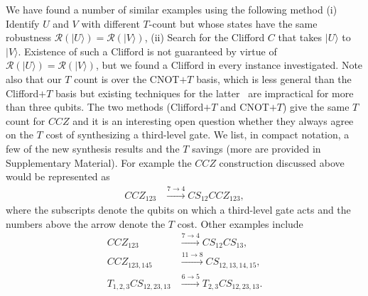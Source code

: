 \documentclass[aps,prl,twocolumn,showpacs,superscriptaddress,groupedaddress,amsmath,amssymb]{revtex4-1}  %
\def\ket #1{\vert #1\rangle}
\begin{document}
We have found a number of similar examples using the following method (i) Identify $U$ and $V$ with different $T$-count but whose states have the same robustness $\mathcal{R}(\ket{U})=\mathcal{R}(\ket{V})$, (ii) Search for the Clifford $C$ that takes $\ket{U}$ to $\ket{V}$.  Existence of such a Clifford is not guaranteed by virtue of $\mathcal{R}(\ket{U})=\mathcal{R}(\ket{V})$, but we found a Clifford in every instance investigated. Note also that our $T$ count is over the CNOT$+T$ basis, which is less general than the Clifford$+T$ basis but existing techniques for the latter~\cite{gosset_algorithm_2014} are impractical for more than three qubits. %
The two methods (Clifford$+T$ and CNOT$+T$) give the same $T$ count for $CCZ$ and it is an interesting open question whether they always agree on the $T$ cost of synthesizing a third-level gate.  We list, in compact notation, a few of the new synthesis results and the $T$ savings (more are provided in Supplementary Material). For example the $CCZ$ construction discussed above would be represented as
\begin{align}
CCZ_{123}  &\overset{7 \rightarrow 4}{\longrightarrow} CS_{12}CCZ_{123} ,
\end{align}
where the subscripts denote the qubits on which a third-level gate acts  and the numbers above the arrow denote the $T$ cost. Other examples include
\begin{align}
CCZ_{123}  &\overset{7 \rightarrow 4}{\longrightarrow} CS_{12}CS_{13},\\
CCZ_{123,145}  &\overset{11 \rightarrow 8}{\longrightarrow} CS_{12,13,14,15},\\
T_{1,2,3}CS_{12,23,13}  &\overset{6 \rightarrow 5}{\longrightarrow} T_{2,3}CS_{12,23,13}.
\end{align}
\end{document}
